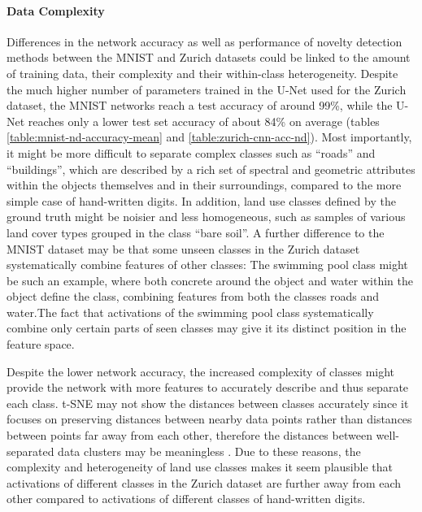 \documentclass[10pt]{article}
\begin{document}
\paragraph{Data Complexity} Differences in the network accuracy as well as performance of novelty detection methods between the \gls{MNIST} and Zurich datasets could be linked to the amount of training data, their complexity and their within-class heterogeneity. Despite the much higher number of parameters trained in the U-Net used for the Zurich dataset,  the \gls{MNIST} networks reach a test accuracy of around 99\%, while the U-Net reaches only a lower test set accuracy of about 84\% on average (tables \ref{table:mnist-nd-accuracy-mean} and \ref{table:zurich-cnn-acc-nd}). Most importantly, it might be more difficult to separate complex classes such as ``roads'' and ``buildings'', which are described by a rich set of spectral and geometric attributes within the objects themselves and in their surroundings, compared to the more simple case of hand-written digits. In addition, land use classes defined by the ground truth might be noisier and less homogeneous, such as samples of various land cover types grouped in the class ``bare soil''.  A further difference to the \gls{MNIST} dataset may be that some unseen classes in the Zurich dataset systematically combine features of other classes: The swimming pool class might be such an example, where both concrete around the object and water within the object define the class, combining features from both the classes roads and water.The fact that activations of the swimming pool class systematically combine only certain parts of seen classes may give it its distinct position in the feature space. 

Despite the lower network accuracy, the increased complexity of classes might provide the network with more features to accurately describe and thus separate each class. \gls{t-SNE} may not show the distances between classes accurately since it focuses on preserving distances between nearby data points rather than distances between points far away from each other, therefore the distances between well-separated data clusters may be meaningless \cite{Maaten2008VisualizingDU, wattenberg2016how}. Due to these reasons, the complexity and heterogeneity of land use classes makes it seem plausible that activations of different classes in the Zurich dataset are further away from each other compared to activations of different classes of hand-written digits.

\end{document}

